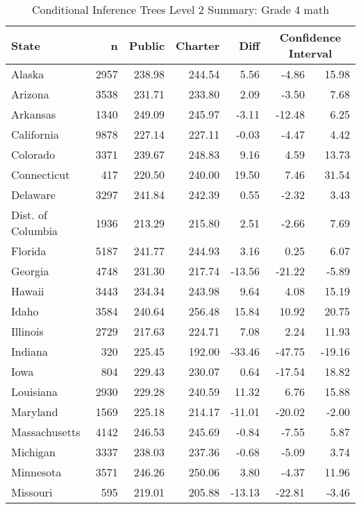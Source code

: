 \begin{table}[ht]
\begin{center}
\caption{Conditional Inference Trees Level 2 Summary: Grade 4 math}
\label{g4mathtreelevel2}
\begin{tabular}{lrrrrrr}
  \hline
  State & n & Public & Charter & Diff & \multicolumn{2}{c}{Confidence Interval} \\ \hline
Alaska & 2957 & 238.98 & 244.54 & 5.56 & -4.86 & 15.98 \\ 
  Arizona & 3538 & 231.71 & 233.80 & 2.09 & -3.50 & 7.68 \\ 
  Arkansas & 1340 & 249.09 & 245.97 & -3.11 & -12.48 & 6.25 \\ 
  California & 9878 & 227.14 & 227.11 & -0.03 & -4.47 & 4.42 \\ 
  Colorado & 3371 & 239.67 & 248.83 & 9.16 & 4.59 & 13.73 \\ 
  Connecticut & 417 & 220.50 & 240.00 & 19.50 & 7.46 & 31.54 \\ 
  Delaware & 3297 & 241.84 & 242.39 & 0.55 & -2.32 & 3.43 \\ 
  Dist. of Columbia & 1936 & 213.29 & 215.80 & 2.51 & -2.66 & 7.69 \\ 
  Florida & 5187 & 241.77 & 244.93 & 3.16 & 0.25 & 6.07 \\ 
  Georgia & 4748 & 231.30 & 217.74 & -13.56 & -21.22 & -5.89 \\ 
  Hawaii & 3443 & 234.34 & 243.98 & 9.64 & 4.08 & 15.19 \\ 
  Idaho & 3584 & 240.64 & 256.48 & 15.84 & 10.92 & 20.75 \\ 
  Illinois & 2729 & 217.63 & 224.71 & 7.08 & 2.24 & 11.93 \\ 
  Indiana & 320 & 225.45 & 192.00 & -33.46 & -47.75 & -19.16 \\ 
  Iowa & 804 & 229.43 & 230.07 & 0.64 & -17.54 & 18.82 \\ 
  Louisiana & 2930 & 229.28 & 240.59 & 11.32 & 6.76 & 15.88 \\ 
  Maryland & 1569 & 225.18 & 214.17 & -11.01 & -20.02 & -2.00 \\ 
  Massachusetts & 4142 & 246.53 & 245.69 & -0.84 & -7.55 & 5.87 \\ 
  Michigan & 3337 & 238.03 & 237.36 & -0.68 & -5.09 & 3.74 \\ 
  Minnesota & 3571 & 246.26 & 250.06 & 3.80 & -4.37 & 11.96 \\ 
  Missouri & 595 & 219.01 & 205.88 & -13.13 & -22.81 & -3.46 \\ 

\end{tabular}
\end{center}
\end{table}
